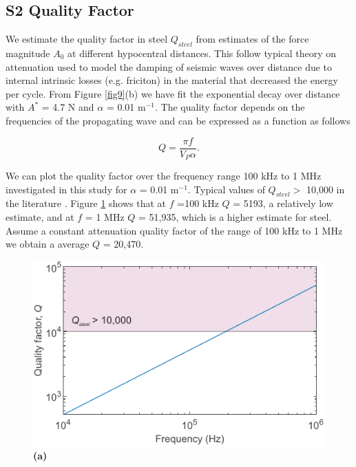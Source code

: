 \documentclass[preprint,3p, 11pt,authoryear]{elsarticle}
\begin{document}
\clearpage
\subsection*{S2 Quality Factor}
We estimate the quality factor in steel $Q_{steel}$ from estimates of the force magnitude $A_{0}$ at different hypocentral distances. This follow typical theory on attenuation used to model the damping of seismic waves over distance due to internal intrinsic losses (e.g. friciton) in the material that decreased the energy per cycle\citep[e.g.][]{Barton2007}. From Figure \ref{fig9}(b) we have fit the exponential decay over distance with $A^{*}$ = 4.7 N and $\alpha$ = 0.01 m$^{-1}$. The quality factor depends on the frequencies of the propagating wave and can be expressed as a function as follows

\begin{equation}
    \label{eqS2}
Q = \frac{\pi f}{V_{P}\alpha}.
\end{equation}

\noindent We can plot the quality factor over the frequency range 100 kHz to 1 MHz investigated in this study for $\alpha$ = 0.01 m$^{-1}$. Typical values of $Q_{steel} > $ 10,000 in the literature \citep{WaitingRUI}. Figure \ref{figS1} shows that at $f$ =100 kHz $Q$ = 5193, a relatively low estimate, and at $f$ = 1 MHz $Q$ = 51,935, which is a higher estimate for steel. Assume a constant attenuation quality factor of the range of 100 kHz to 1 MHz we obtain a average $Q$ = 20,470. 


\begin{figure}[ht]
     	\centering
\includegraphics[scale= 1]{FIGS1.pdf} 
\caption{\textbf{(a)}  }
	\label{figS1} 
\end{figure}
\clearpage
 

\end{document}
